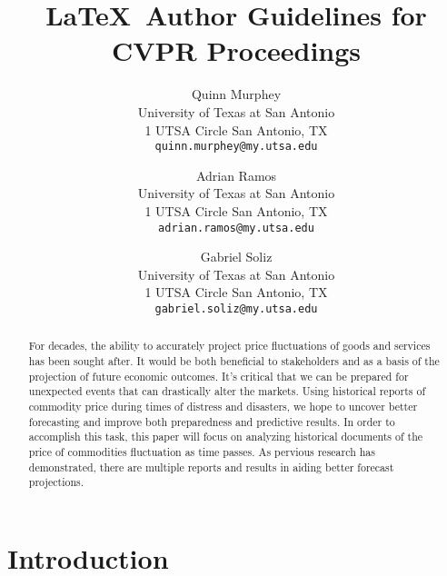 \documentclass[final]{cvpr}
\begin{document}
\title{\LaTeX\ Author Guidelines for CVPR Proceedings}

\author{Quinn Murphey\\
University of Texas at San Antonio\\
1 UTSA Circle San Antonio, TX\\
{\tt\small quinn.murphey@my.utsa.edu}
\and
Adrian Ramos\\
University of Texas at San Antonio\\
1 UTSA Circle San Antonio, TX\\
{\tt\small adrian.ramos@my.utsa.edu}

\and
Gabriel Soliz\\
University of Texas at San Antonio\\
1 UTSA Circle San Antonio, TX\\
{\tt\small gabriel.soliz@my.utsa.edu}
}

\maketitle


\begin{abstract}
    For decades, the ability to accurately project price fluctuations of goods
    and services has been sought after. It would be both beneficial to
    stakeholders and as a basis of the projection of future economic outcomes.
    It’s critical that we can be prepared for unexpected events that can
    drastically alter the markets. Using historical reports of commodity price
    during times of distress and disasters, we hope to uncover better
    forecasting and improve both preparedness and predictive results. In order
    to accomplish this task, this paper will focus on analyzing historical
    documents of the price of commodities fluctuation as time passes. As
    pervious research has demonstrated, there are multiple reports and results
    in aiding better forecast projections.    
\end{abstract}


\section{Introduction}
\end{document}
